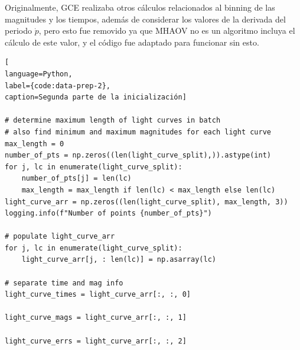 Originalmente, GCE realizaba otros cálculos relacionados al binning de las magnitudes y los tiempos, además de considerar los valores de la derivada del periodo $\dot p$, pero esto fue removido ya que MHAOV no es un algoritmo incluya el cálculo de este valor, y el código fue adaptado para funcionar sin esto.
\begin{lstlisting}[
language=Python,
label={code:data-prep-2},
caption=Segunda parte de la inicialización]

# determine maximum length of light curves in batch
# also find minimum and maximum magnitudes for each light curve
max_length = 0
number_of_pts = np.zeros((len(light_curve_split),)).astype(int)
for j, lc in enumerate(light_curve_split):
    number_of_pts[j] = len(lc)
    max_length = max_length if len(lc) < max_length else len(lc)
light_curve_arr = np.zeros((len(light_curve_split), max_length, 3))
logging.info(f"Number of points {number_of_pts}")

# populate light_curve_arr
for j, lc in enumerate(light_curve_split):
    light_curve_arr[j, : len(lc)] = np.asarray(lc)

# separate time and mag info
light_curve_times = light_curve_arr[:, :, 0]

light_curve_mags = light_curve_arr[:, :, 1]

light_curve_errs = light_curve_arr[:, :, 2]
\end{lstlisting}

